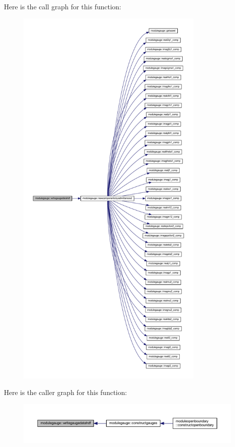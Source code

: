 Here is the call graph for this function\+:\nopagebreak
\begin{figure}[H]
\begin{center}
\leavevmode
\includegraphics[height=550pt]{namespacemodulegauge_a473e631b98b7b3cb869f4ede62f77425_cgraph}
\end{center}
\end{figure}
Here is the caller graph for this function\+:\nopagebreak
\begin{figure}[H]
\begin{center}
\leavevmode
\includegraphics[width=350pt]{namespacemodulegauge_a473e631b98b7b3cb869f4ede62f77425_icgraph}
\end{center}
\end{figure}


